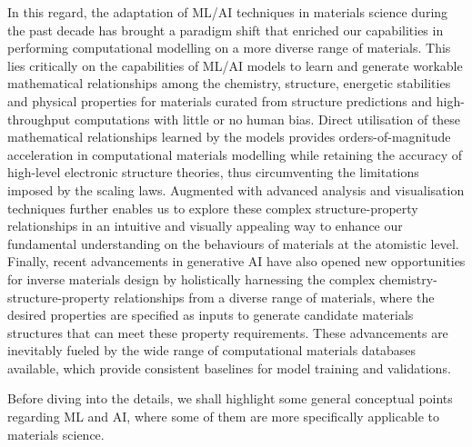 In this regard, the adaptation of ML/AI techniques in materials science during the past decade has brought a paradigm shift that enriched our capabilities in performing computational modelling on a more diverse range of materials. This lies critically on the capabilities of ML/AI models to learn and generate workable mathematical relationships among the chemistry, structure, energetic stabilities and physical properties for materials curated from structure predictions and high-throughput computations with little or no human bias. Direct utilisation of these mathematical relationships learned by the models provides orders-of-magnitude acceleration in computational materials modelling while retaining the accuracy of high-level electronic structure theories, thus circumventing the limitations imposed by the scaling laws. Augmented with advanced analysis and visualisation techniques further enables us to explore these complex structure-property relationships in an intuitive and visually appealing way to enhance our fundamental understanding on the behaviours of materials at the atomistic level. Finally, recent advancements in generative AI have also opened new opportunities for inverse materials design by holistically harnessing the complex chemistry-structure-property relationships from a diverse range of materials, where the desired properties are specified as inputs to generate candidate materials structures that can meet these property requirements. These advancements are inevitably fueled by the wide range of computational materials databases available, which provide consistent baselines for model training and validations.

Before diving into the details, we shall highlight some general conceptual points regarding ML and AI, where some of them are more specifically applicable to materials science.

